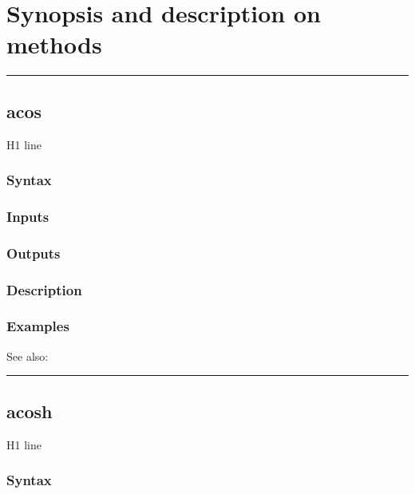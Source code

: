 \documentclass[letterpaper,10pt,english]{sphinxmanual}
\begin{document}
\section{Synopsis and description on methods}
\label{classes/time_series/@ts/ts:synopsis-and-description-on-methods}

\bigskip\hrule{}\bigskip



\subsection{acos}
\label{classes/time_series/@ts/ts:acos}\label{classes/time_series/@ts/ts:id1}
H1 line


\subsubsection{Syntax}
\label{classes/time_series/@ts/ts:syntax}

\subsubsection{Inputs}
\label{classes/time_series/@ts/ts:inputs}

\subsubsection{Outputs}
\label{classes/time_series/@ts/ts:outputs}

\subsubsection{Description}
\label{classes/time_series/@ts/ts:description}

\subsubsection{Examples}
\label{classes/time_series/@ts/ts:examples}
See also:


\bigskip\hrule{}\bigskip



\subsection{acosh}
\label{classes/time_series/@ts/ts:id2}\label{classes/time_series/@ts/ts:acosh}
H1 line


\subsubsection{Syntax}
\label{classes/time_series/@ts/ts:id3}
\end{document}
